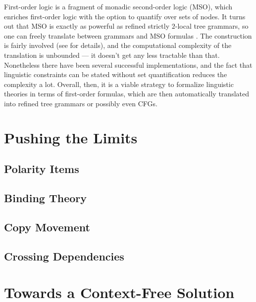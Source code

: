 First-order logic is a fragment of monadic second-order logic (MSO), which enriches first-order logic with the option to quantify over sets of nodes.
It turns out that MSO is exactly as powerful as refined strictly $2$-local tree grammars, so one can freely translate between grammars and MSO formulas \citep{Buechi60}.
The construction is fairly involved (see \citealt{Morawietz03} for details), and the computational complexity of the translation is unbounded --- it doesn't get any less tractable than that.
Nonetheless there have been several successful implementations, and the fact that linguistic constraints can be stated without set quantification reduces the complexity a lot.
Overall, then, it is a viable strategy to formalize linguistic theories in terms of first-order formulas, which are then automatically translated into refined tree grammars or possibly even CFGs.

\section{Pushing the Limits}

\subsection{Polarity Items}

\subsection{Binding Theory}

\subsection{Copy Movement}

\subsection{Crossing Dependencies}

\section{Towards a Context-Free Solution}
